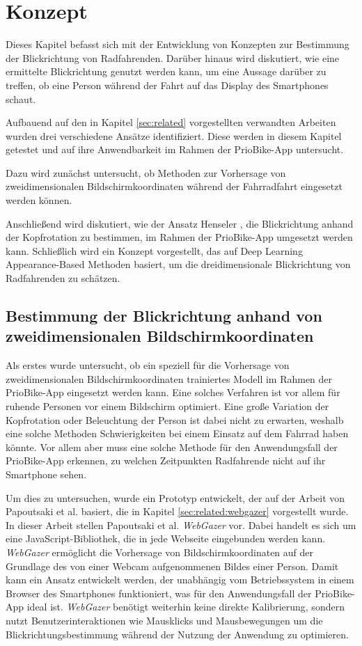 \chapter{Konzept}\label{sec:concept}

Dieses Kapitel befasst sich mit der Entwicklung von Konzepten zur Bestimmung der Blickrichtung von Radfahrenden. Darüber hinaus wird diskutiert, wie eine ermittelte Blickrichtung genutzt werden kann, um eine Aussage darüber zu treffen, ob eine Person während der Fahrt auf das Display des Smartphones schaut.

Aufbauend auf den in Kapitel \ref{sec:related} vorgestellten verwandten Arbeiten wurden drei verschiedene Ansätze identifiziert. Diese werden in diesem Kapitel getestet und auf ihre Anwendbarkeit im Rahmen der PrioBike-App untersucht.

Dazu wird zunächst untersucht, ob Methoden zur Vorhersage von zweidimensionalen Bildschirmkoordinaten während der Fahrradfahrt eingesetzt werden können. 

Anschließend wird diskutiert, wie der Ansatz Henseler \cite{bachelor:henseler:gaze-ebikes}, die Blickrichtung anhand der Kopfrotation zu bestimmen, im Rahmen der PrioBike-App umgesetzt werden kann.  Schließlich wird ein Konzept vorgestellt, das auf Deep Learning Appearance-Based Methoden basiert, um die dreidimensionale Blickrichtung von Radfahrenden zu schätzen.

\section{Bestimmung der Blickrichtung anhand von zweidimensionalen Bildschirmkoordinaten}\label{sec:concept:2d}

Als erstes wurde untersucht, ob ein speziell für die Vorhersage von zweidimensionalen Bildschirmkoordinaten trainiertes Modell im Rahmen der PrioBike-App eingesetzt werden kann. Eine solches Verfahren ist vor allem für ruhende Personen vor einem Bildschirm optimiert. Eine große Variation der Kopfrotation oder Beleuchtung der Person ist dabei nicht zu erwarten, weshalb eine solche Methoden Schwierigkeiten bei einem Einsatz auf dem Fahrrad haben könnte. Vor allem aber muss eine solche Methode für den Anwendungsfall der PrioBike-App erkennen, zu welchen Zeitpunkten Radfahrende nicht auf ihr Smartphone sehen. 

Um dies zu untersuchen, wurde ein Prototyp entwickelt, der auf der Arbeit von Papoutsaki et al. \cite{paper:webgazer} basiert, die in Kapitel \ref{sec:related:webgazer} vorgestellt wurde. In dieser Arbeit stellen Papoutsaki et al. \textit{WebGazer} vor. Dabei handelt es sich um eine JavaScript-Bibliothek, die in jede Webseite eingebunden werden kann. \textit{WebGazer} ermöglicht die Vorhersage von Bildschirmkoordinaten auf der Grundlage des von einer Webcam aufgenommenen Bildes einer Person. Damit kann ein Ansatz entwickelt werden, der unabhängig vom Betriebssystem in einem Browser des Smartphones funktioniert, was für den Anwendungsfall der PrioBike-App ideal ist. \textit{WebGazer} benötigt weiterhin keine direkte Kalibrierung, sondern nutzt Benutzerinteraktionen wie Mausklicks und Mausbewegungen um die Blickrichtungsbestimmung während der Nutzung der Anwendung zu optimieren.

